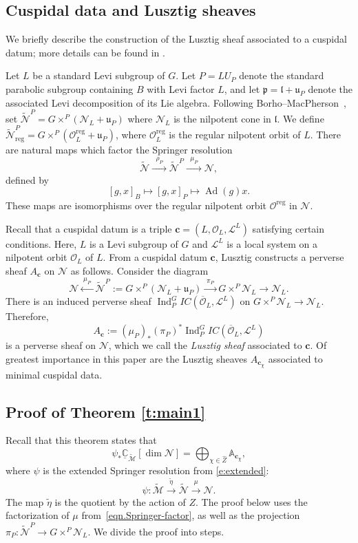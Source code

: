 \documentclass[reqno,11pt]{amsart}
\theoremstyle{remark}
\theoremstyle{remark}
\theoremstyle{definition}
\theoremstyle{definition}
\theoremstyle{definition}
\numberwithin{equation}{section}
\newcommand{\A}{\mathbb{ A}}
\newcommand{\C}{\mathbb{C}}           %
\newcommand{\Ad}{\operatorname{Ad }}             %
\newcommand{\Ind}{\operatorname{Ind}}
\newcommand{\fl}{{\mathfrak l}}
\newcommand{\fp}{{\mathfrak p}}
\newcommand{\fu}{{\mathfrak u}}
\newcommand{\cl}{\mathcal{L}}
\newcommand{\cm}{\mathcal{M}}
\newcommand{\cn}{\mathcal{N}}
\newcommand{\co}{\mathcal{O}}
\newcommand{\vc}{\mathbf{c}}
\newcommand{\shc}{\underline{\C}}
\renewcommand{\tilde}{\widetilde}
\renewcommand{\hat}{\widehat}
\newcommand{\reg}{\mathrm{reg}}
\begin{document}

\subsection{Cuspidal data and Lusztig sheaves} \label{ss.cuspidal}
We briefly describe the construction of the Lusztig sheaf associated to a cuspidal datum; more details can be found in \cite{GPR23}. 

Let $L$ be a standard Levi subgroup of $G$. Let $P = L U_P$ denote the standard parabolic subgroup containing $B$ with Levi factor $L$, and let $\fp = \fl + \fu_P$ denote the associated Levi decomposition of its Lie algebra.  Following Borho--MacPherson~\cite{Borho1981}, set $\tilde{\cn}^P = G \times^P (\cn_L + \fu_P)$ where $\cn_L$ is the nilpotent cone in $\fl$.  We define $\tilde{\cn}^P_{\reg} = G \times^P (\co_L^{\reg} + \fu_P)$, where $\co_L^{\reg}$ is the regular nilpotent orbit of $L$.  There are natural maps which factor the Springer resolution
\begin{equation}\label{eqn.Springer-factor}
\tilde{\cn} \xrightarrow{\;\;\rho_P\;\;} \tilde{\cn}^P \xrightarrow{\;\;\mu_P\;\;} \cn,
\end{equation}
defined by
$$
[g,x]_B \mapsto [g,x]_P \mapsto \Ad(g) x.
$$
These maps are isomorphisms over the regular nilpotent orbit $\co^{\reg}$ in $\cn$.  


Recall that a cuspidal datum is a triple $\vc = (L,\co_L, \cl^L)$ satisfying certain conditions.  Here, $L$ is a Levi subgroup of $G$ and $\cl^L$ is a local system on a nilpotent orbit $\co_L$ of $L$. 
From a cuspidal datum $\vc$, Lusztig constructs a perverse sheaf $A_{\vc}$ on $\cn$ as follows.  Consider the diagram
\[
\cn\xleftarrow{\;\mu_P\;} \widetilde{\cn}^P:=G\times^P (\cn_L+\fu_P)\xrightarrow{\;\pi_P\;} G\times^P \cn_L{\longrightarrow} \cn_L.
\]
There is an induced perverse sheaf $\Ind_P^G IC(\overline{\co}_L, \cl^L)$ on $G\times^P \cn_L{\longrightarrow} \cn_L$.  Therefore,
\[
A_{\vc} := (\mu_P)_* (\pi_P)^* \Ind_P^G IC(\overline{\co}_L, \cl^L)
\] 
is a perverse sheaf on $\cn$, which we call the \emph{Lusztig sheaf} associated to $\vc$.
Of greatest importance in this paper are the Lusztig sheaves $A_{\vc_{\chi}}$ associated to minimal cuspidal data.


\subsection{Proof of Theorem \ref{t:main1}} Recall that this theorem states that 
$$
\psi_* \shc_{\tilde{\cm}}[\dim \cn] = \bigoplus_{\chi \in \hat{Z}} \A_{\vc_{\chi}},
$$
where $\psi$ is the extended Springer resolution from \eqref{e:extended}:
$$
\psi: \tilde{\cm} \stackrel{\tilde{\eta}}{\longrightarrow} \tilde{\cn} \stackrel{\mu}{\longrightarrow} \cn.
$$
The map $\tilde{\eta}$ is the quotient by the action of $Z$.
The proof below uses
the factorization of $\mu$ from~\eqref{eqn.Springer-factor}, as well as the projection $\pi_P: \tilde{\cn}^P \to G\times ^P \cn_L$.  
We divide the proof into steps. 
\end{document}
